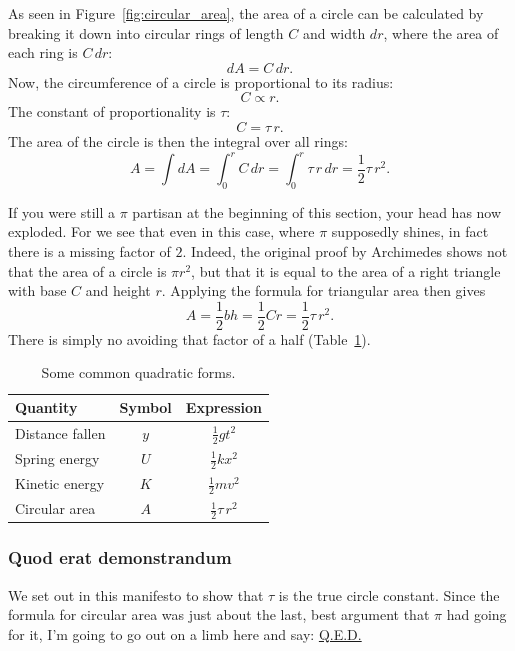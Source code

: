 As seen in Figure~\ref{fig:circular_area}, the area of a circle can be calculated by breaking it down into circular rings of length $C$ and width $dr$, where the area of each ring is $C\,dr$:
\[ dA = C\,dr. \]
Now, the circumference of a circle is proportional to its radius:
\[ C \propto r. \]
The constant of proportionality is $\tau$:
\[ C = \tau\,r. \]
The area of the circle is then the integral over all rings:
\[ A = \int dA = \int_0^r C\,dr = \int_0^r \tau\,r\,dr = \textstyle{\frac{1}{2}} \tau\,r^2. \]

If you were still a $\pi$ partisan at the beginning of this section, your head has now exploded. For we see that even in this case, where $\pi$ supposedly shines, in fact there is a missing factor of $2$. Indeed, the original proof by Archimedes shows not that the area  of a circle is $\pi r^2$, but that it is equal to the area of a right triangle with base $C$ and height $r$. Applying the formula for triangular area then gives
\[
  A = \textstyle{\frac{1}{2}} bh = \textstyle{\frac{1}{2}}Cr = \textstyle{\frac{1}{2}}\tau\,r^2.
\]
There is simply no avoiding that factor of a half (Table~\ref{table:quadratic_forms}).

\begin{table}
\begin{center}
\begin{tabular}{lcc}
Quantity & Symbol & Expression \\ \hline
Distance fallen & $y$ & $\textstyle{\frac{1}{2}}gt^2$ \smallskip \\
Spring energy & $U$ & $\textstyle{\frac{1}{2}}kx^2$ \smallskip \\
Kinetic energy & $K$ & $\textstyle{\frac{1}{2}}mv^2$ \smallskip \\
Circular area & $A$ & $\textstyle{\frac{1}{2}}\tau\,r^2$
\end{tabular}
\end{center}
\caption{Some common quadratic forms.\label{table:quadratic_forms}}
\end{table}

    \subsubsection{Quod erat demonstrandum} %
    \label{sec:quod_erat_demonstrandum}

We set out in this manifesto to show that $\tau$ is the true circle constant. Since the formula for circular area was just about the last, best argument that $\pi$ had going for it, I'm going to go out on a limb here and say: \href{http://en.wikipedia.org/wiki/Q.E.D.}{Q.E.D.}

